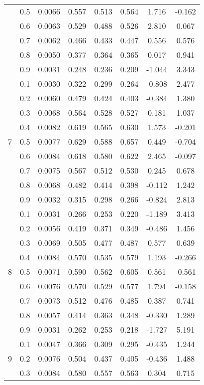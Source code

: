 \documentclass[11pt,a4paper]{report}
\begin{document}
\begin{longtable}{ | c | c || c | c | c | c | c | c | }
 & 0.5 & 0.0066 & 0.557 & 0.513 & 0.564 & 1.716 & -0.162 \\
 & 0.6 & 0.0063 & 0.529 & 0.488 & 0.526 & 2.810 & 0.067 \\
 & 0.7 & 0.0062 & 0.466 & 0.433 & 0.447 & 0.556 & 0.576 \\
 & 0.8 & 0.0050 & 0.377 & 0.364 & 0.365 & 0.017 & 0.941 \\
 & 0.9 & 0.0031 & 0.248 & 0.236 & 0.209 & -1.044 & 3.343 \\
 \hline
\multirow{9}{*}{7} & 0.1 & 0.0030 & 0.322 & 0.299 & 0.264 & -0.808 & 2.477 \\
 & 0.2 & 0.0060 & 0.479 & 0.424 & 0.403 & -0.384 & 1.380 \\
 & 0.3 & 0.0068 & 0.564 & 0.528 & 0.527 & 0.181 & 1.037 \\
 & 0.4 & 0.0082 & 0.619 & 0.565 & 0.630 & 1.573 & -0.201 \\
 & 0.5 & 0.0077 & 0.629 & 0.588 & 0.657 & 0.449 & -0.704 \\
 & 0.6 & 0.0084 & 0.618 & 0.580 & 0.622 & 2.465 & -0.097 \\
 & 0.7 & 0.0075 & 0.567 & 0.512 & 0.530 & 0.245 & 0.678 \\
 & 0.8 & 0.0068 & 0.482 & 0.414 & 0.398 & -0.112 & 1.242 \\
 & 0.9 & 0.0032 & 0.315 & 0.298 & 0.266 & -0.824 & 2.813 \\
 \hline
\multirow{9}{*}{8} & 0.1 & 0.0031 & 0.266 & 0.253 & 0.220 & -1.189 & 3.413 \\
 & 0.2 & 0.0056 & 0.419 & 0.371 & 0.349 & -0.486 & 1.456 \\
 & 0.3 & 0.0069 & 0.505 & 0.477 & 0.487 & 0.577 & 0.639 \\
 & 0.4 & 0.0084 & 0.570 & 0.535 & 0.579 & 1.193 & -0.266 \\
 & 0.5 & 0.0071 & 0.590 & 0.562 & 0.605 & 0.561 & -0.561 \\
 & 0.6 & 0.0076 & 0.570 & 0.529 & 0.577 & 1.794 & -0.158 \\
 & 0.7 & 0.0073 & 0.512 & 0.476 & 0.485 & 0.387 & 0.741 \\
 & 0.8 & 0.0057 & 0.414 & 0.363 & 0.348 & -0.330 & 1.289 \\
 & 0.9 & 0.0031 & 0.262 & 0.253 & 0.218 & -1.727 & 5.191 \\
 \hline
\multirow{9}{*}{9} & 0.1 & 0.0047 & 0.366 & 0.309 & 0.295 & -0.435 & 1.244 \\
 & 0.2 & 0.0076 & 0.504 & 0.437 & 0.405 & -0.436 & 1.488 \\
 & 0.3 & 0.0084 & 0.580 & 0.557 & 0.563 & 0.304 & 0.715 \\

\end{longtable}
\end{document}

